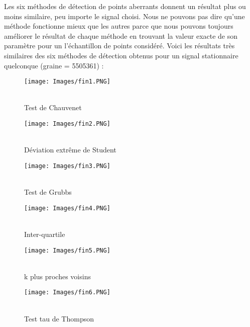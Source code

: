 \documentclass[a4paper,12pt]{article} %
\begin{document}
            Les six méthodes de détection de points aberrants donnent un résultat plus ou moins similaire, peu importe le signal choisi. Nous ne pouvons pas dire qu'une méthode fonctionne mieux que les autres parce que nous pouvons toujours améliorer le résultat de chaque méthode en trouvant la valeur exacte de son paramètre pour un l'échantillon de points considéré. Voici les résultats très similaires des six méthodes de détection obtenus pour un signal stationnaire quelconque (graine = 5505361) :
            \begin{figure}[H] %
            \texttt{[image: Images/fin1.PNG]} %
            \caption{\\Test de Chauvenet} %
            \label{m15} %
            \endminipage
            \hfill
            \endminipage
            \texttt{[image: Images/fin2.PNG]}  
            \caption{\\Déviation extrême de Student}
            \label{m5}
            \endminipage
            \hfill
            \endminipage
            \texttt{[image: Images/fin3.PNG]}  
            \caption{\\Test de Grubbs}
            \label{m35}
            \endminipage
            \end{figure}
            
            \begin{figure}[H] %
            \texttt{[image: Images/fin4.PNG]} %
            \caption{\\Inter-quartile} %
            \label{m15} %
            \endminipage
            \hfill
            \endminipage
            \texttt{[image: Images/fin5.PNG]}  
            \caption{\\k plus proches voisins}
            \label{m5}
            \endminipage
            \hfill
            \endminipage
            \texttt{[image: Images/fin6.PNG]}  
            \caption{\\Test tau de Thompson}
            \label{m35}
            \endminipage
            \end{figure}
            
\end{document}
